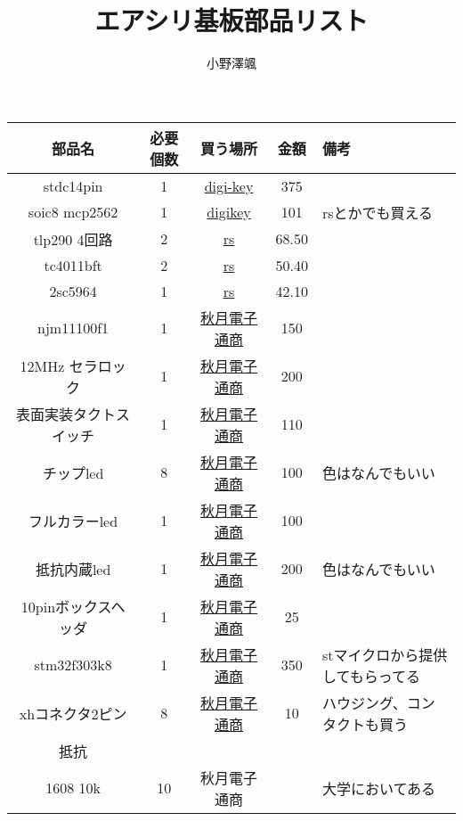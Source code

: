 \documentclass[12pt,a4paper,dvipdfmx]{ujarticle}
\title{エアシリ基板部品リスト}
\author{小野澤颯}
\begin{document}
\maketitle
\begin{tabular}{ccccl}
	\hline
	部品名 &必要個数& 買う場所 & 金額 & 備考\\
	\hline
	stdc14pin &1&\href{https://www.digikey.jp/product-detail/ja/samtec-inc/FTSH-107-01-L-D-K/612-FTSH-107-01-L-D-K-ND/6693516}{digi-key}&375&\\
	\hline
	soic8 mcp2562&1& \href{https://www.digikey.jp/product-detail/ja/microchip-technology/MCP2562T-E-SN/MCP2562T-E-SNCT-ND/5011025}{digikey}&101 & rsとかでも買える\\
	\hline
	tlp290 4回路 & 2 & \href{https://jp.rs-online.com/web/p/products/8851083/}{rs}&68.50&\\
	\hline
	tc4011bft &2&\href{https://jp.rs-online.com/web/p/products/6634283/}{rs}&50.40&\\
	\hline
	2sc5964 &1&\href{https://jp.rs-online.com/web/p/products/7740746/}{rs}&42.10&\\
	\hline
	njm11100f1 &1&\href{https://akizukidenshi.com/catalog/g/gI-06655/}{秋月電子通商}&150&\\
	\hline
	12MHz セラロック &1&\href{https://akizukidenshi.com/catalog/g/gP-14322/}{秋月電子通商}&200&\\
	\hline
	表面実装タクトスイッチ&1&\href{https://akizukidenshi.com/catalog/g/gP-14888/}{秋月電子通商}&110&\\
	\hline
	チップled & 8 & \href{https://akizukidenshi.com/catalog/g/gI-11880/}{秋月電子通商}&100 &色はなんでもいい\\
	\hline
	フルカラーled & 1 & \href{https://akizukidenshi.com/catalog/g/gI-12726/}{秋月電子通商}&100 &\\
	\hline
	抵抗内蔵led & 1 & \href{https://akizukidenshi.com/catalog/g/gI-06252/}{秋月電子通商}&200&色はなんでもいい\\
	\hline
	10pinボックスヘッダ & 1 & \href{https://akizukidenshi.com/catalog/g/gC-13178/}{秋月電子通商}&25 &\\
	\hline
	stm32f303k8 &1&\href{https://akizukidenshi.com/catalog/g/gI-10790/}{秋月電子通商}&350&stマイクロから提供してもらってる\\
	\hline
	xhコネクタ2ピン&8& \href{https://akizukidenshi.com/catalog/g/gC-12247/}{秋月電子通商} &10& ハウジング、コンタクトも買う\\
	\hline
	抵抗& & & &\\
	\hline
	1608 10k&10&秋月電子通商 & &大学においてある\\

\end{tabular}
\end{document}
